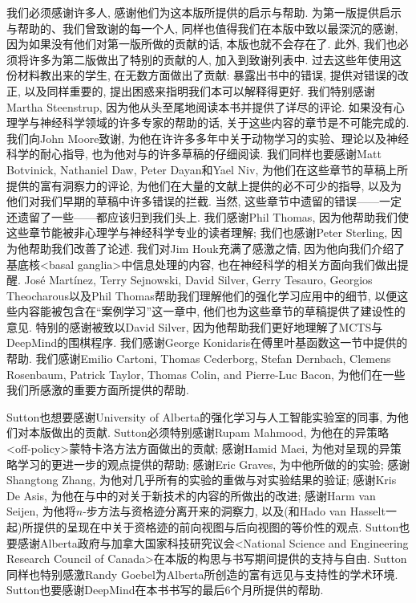 我们必须感谢许多人, 感谢他们为这本版所提供的启示与帮助. 为第一版提供启示与帮助的、我们曾致谢的每一个人, 同样也值得我们在本版中致以最深沉的感谢, 因为如果没有他们对第一版所做的贡献的话, 本版也就不会存在了. 此外, 我们也必须将许多为第二版做出了特别的贡献的人, 加入到致谢列表中. 过去这些年使用这份材料教出来的学生, 在无数方面做出了贡献: 暴露出书中的错误, 提供对错误的改正, 以及同样重要的, 提出困惑来指明我们本可以解释得更好. 我们特别感谢Martha Steenstrup, 因为他从头至尾地阅读本书并提供了详尽的评论. 如果没有心理学与神经科学领域的许多专家的帮助的话, 关于这些内容的章节是不可能完成的. 我们向John Moore致谢, 为他在许许多多年中关于动物学习的实验、理论以及神经科学的耐心指导, 也为他对与的许多草稿的仔细阅读. 我们同样也要感谢Matt Botvinick, Nathaniel Daw, Peter Dayan和Yael Niv, 为他们在这些章节的草稿上所提供的富有洞察力的评论, 为他们在大量的文献上提供的必不可少的指导, 以及为他们对我们早期的草稿中许多错误的拦截. 当然, 这些章节中遗留的错误——一定还遗留了一些——都应该归到我们头上. 我们感谢Phil Thomas, 因为他帮助我们使这些章节能被非心理学与神经科学专业的读者理解; 我们也感谢Peter Sterling, 因为他帮助我们改善了论述. 我们对Jim Houk充满了感激之情, 因为他向我们介绍了基底核<basal ganglia>中信息处理的内容, 也在神经科学的相关方面向我们做出提醒. José Martínez, Terry Sejnowski, David Silver, Gerry Tesauro, Georgios Theocharous以及Phil Thomas帮助我们理解他们的强化学习应用中的细节, 以便这些内容能被包含在``案例学习''这一章中, 他们也为这些章节的草稿提供了建设性的意见. 特别的感谢被致以David Silver, 因为他帮助我们更好地理解了MCTS与DeepMind的围棋程序. 我们感谢George Konidaris在傅里叶基函数这一节中提供的帮助. 我们感谢Emilio Cartoni, Thomas Cederborg, Stefan Dernbach, Clemens Rosenbaum, Patrick Taylor, Thomas Colin, and Pierre-Luc Bacon, 为他们在一些我们所感激的重要方面所提供的帮助.

Sutton也想要感谢University of Alberta的强化学习与人工智能实验室的同事, 为他们对本版做出的贡献. Sutton必须特别感谢Rupam Mahmood, 为他在的异策略<off-policy>蒙特卡洛方法方面做出的贡献; 感谢Hamid Maei, 为他对呈现的异策略学习的更进一步的观点提供的帮助;  感谢Eric Graves, 为中他所做的的实验; 感谢Shangtong Zhang, 为他对几乎所有的实验的重做与对实验结果的验证; 感谢Kris De Asis, 为他在与中的对关于新技术的内容的所做出的改进; 感谢Harm van Seijen, 为他将$n$-步方法与资格迹分离开来的洞察力, 以及(和Hado van Hasselt一起)所提供的呈现在中关于资格迹的前向视图与后向视图的等价性的观点. Sutton也要感谢Alberta政府与加拿大国家科技研究议会<National Science and Engineering Research Council of Canada>在本版的构思与书写期间提供的支持与自由. Sutton同样也特别感激Randy Goebel为Alberta所创造的富有远见与支持性的学术环境. Sutton也要感谢DeepMind在本书书写的最后6个月所提供的帮助.

